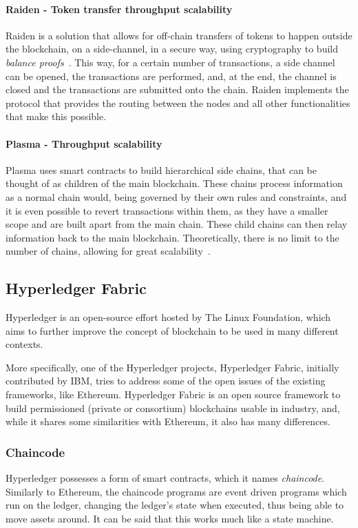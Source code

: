 \paragraph{Raiden - Token transfer throughput scalability}
Raiden is a solution that allows for off-chain transfers of tokens to happen outside the blockchain, on a side-channel, in a secure way, using cryptography to build \textit{balance proofs}~\cite{Hees}. This way, for a certain number of transactions, a side channel can be opened, the transactions are performed, and, at the end, the channel is closed and the transactions are submitted onto the chain. Raiden implements the protocol that provides the routing between the nodes and all other functionalities that make this possible.

\paragraph{Plasma - Throughput scalability}
Plasma uses smart contracts to build hierarchical side chains, that can be thought of as children of the main blockchain. These chains process information as a normal chain would, being governed by their own rules and constraints, and it is even possible to revert transactions within them, as they have a smaller scope and are built apart from the main chain. These child chains can then relay information back to the main blockchain. Theoretically, there is no limit to the number of chains, allowing for great scalability~\cite{Poon2017}.

\break

\subsection{Hyperledger Fabric}

Hyperledger is an open-source effort hosted by The Linux Foundation, which aims to further improve the concept of blockchain to be used in many different contexts. 

More specifically, one of the Hyperledger projects, Hyperledger Fabric, initially contributed by IBM, tries to address some of the open issues of the existing frameworks, like Ethereum. Hyperledger Fabric is an open source framework to build permissioned (private or consortium) blockchains usable in industry, and, while it shares some similarities with Ethereum, it also has many differences. 

\subsubsection{Chaincode}
Hyperledger possesses a form of smart contracts, which it names \textit{chaincode}. Similarly to Ethereum, the chaincode programs are event driven programs which run on the ledger, changing the ledger's state when executed, thus being able to move assets around. It can be said that this works much like a state machine.

